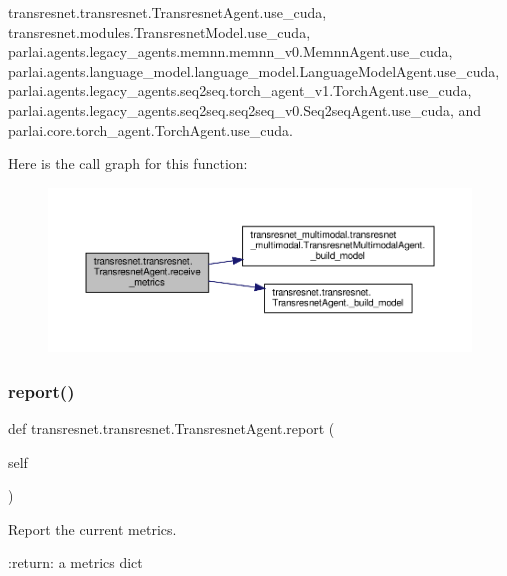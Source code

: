 transresnet.\+transresnet.\+Transresnet\+Agent.\+use\+\_\+cuda, transresnet.\+modules.\+Transresnet\+Model.\+use\+\_\+cuda, parlai.\+agents.\+legacy\+\_\+agents.\+memnn.\+memnn\+\_\+v0.\+Memnn\+Agent.\+use\+\_\+cuda, parlai.\+agents.\+language\+\_\+model.\+language\+\_\+model.\+Language\+Model\+Agent.\+use\+\_\+cuda, parlai.\+agents.\+legacy\+\_\+agents.\+seq2seq.\+torch\+\_\+agent\+\_\+v1.\+Torch\+Agent.\+use\+\_\+cuda, parlai.\+agents.\+legacy\+\_\+agents.\+seq2seq.\+seq2seq\+\_\+v0.\+Seq2seq\+Agent.\+use\+\_\+cuda, and parlai.\+core.\+torch\+\_\+agent.\+Torch\+Agent.\+use\+\_\+cuda.

Here is the call graph for this function\+:
\nopagebreak
\begin{figure}[H]
\begin{center}
\leavevmode
\includegraphics[width=350pt]{classtransresnet_1_1transresnet_1_1TransresnetAgent_a13e2985e367518c17c74096581ecb807_cgraph}
\end{center}
\end{figure}
\mbox{\label{classtransresnet_1_1transresnet_1_1TransresnetAgent_ae3c93bd69572f26004acde7002b31f55}} 
\subsubsection{\texorpdfstring{report()}{report()}}
{\footnotesize\ttfamily def transresnet.\+transresnet.\+Transresnet\+Agent.\+report (\begin{DoxyParamCaption}\item[{}]{self }\end{DoxyParamCaption})}

\begin{DoxyVerb}Report the current metrics.

:return:
    a metrics dict
\end{DoxyVerb}
 


